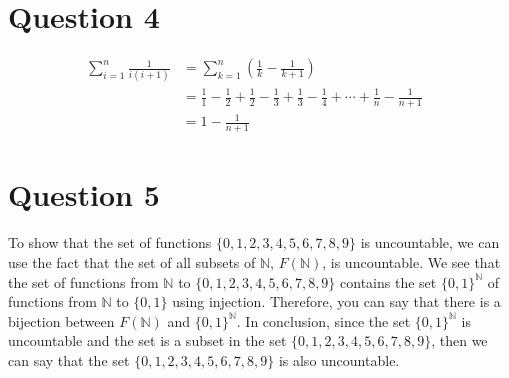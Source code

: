 \documentclass[11pt]{article}
\begin{document}
\section*{Question 4}
\begin{align*}
    \sum_{i=1}^{n} \frac{1}{i(i+1)} & = \sum_{k=1}^{n} \left(\frac{1}{k}-\frac{1}{k+1}\right)&\\
    & = \frac{1}{1} - \frac{1}{2} + \frac{1}{2} - \frac{1}{3} + \frac{1}{3} - \frac{1}{4} + \cdots + \frac{1}{n} - \frac{1}{n+1}&\\
    & = 1 - \frac{1}{n+1}
\end{align*}

\section*{Question 5}
To show that the set of functions $\{ 0, 1, 2, 3, 4, 5, 6, 7, 8, 9 \}$ is uncountable, we can use the fact that the set of all subsets of $\mathbb{N}$, $F(\mathbb{N})$, is uncountable. We see that the set of functions from $\mathbb{N}$ to $\{ 0, 1, 2, 3, 4, 5, 6, 7, 8, 9 \}$ contains the set $\{0, 1\}^{\mathbb{N}}$ of functions from $\mathbb{N}$ to $\{0,1\}$ using injection. Therefore, you can say that there is a bijection between $F(\mathbb{N})$ and $\{0, 1\}^{\mathbb{N}}$. In conclusion, since the set $\{0,1\}^{\mathbb{N}}$ is uncountable and the set is a subset in the set $\{ 0, 1, 2, 3, 4, 5, 6, 7, 8, 9 \}$, then we can say that the set $\{ 0, 1, 2, 3, 4, 5, 6, 7, 8, 9 \}$ is also uncountable.
\end{document}
